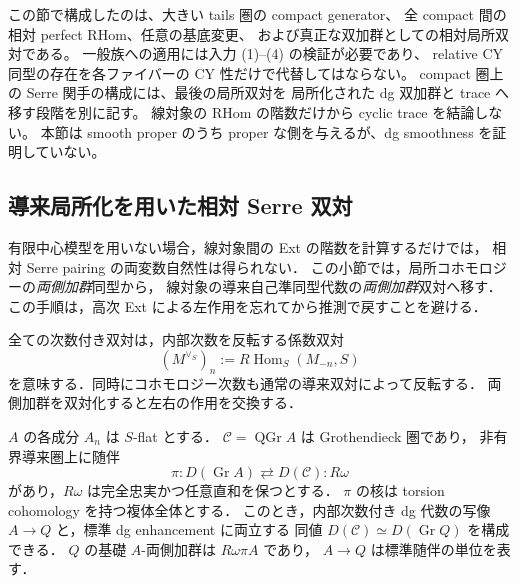 \begin{remark}[ここで確定した範囲と別途必要な入力]
この節で構成したのは、大きい tails 圏の compact generator、
全 compact 間の相対 perfect RHom、任意の基底変更、
および真正な双加群としての相対局所双対である。
一般族への適用には入力 (1)--(4) の検証が必要であり、
relative CY 同型の存在を各ファイバーの CY 性だけで代替してはならない。
compact 圏上の Serre 関手の構成には、最後の局所双対を
局所化された dg 双加群と trace へ移す段階を別に記す。
線対象の RHom の階数だけから cyclic trace を結論しない。
本節は smooth proper のうち proper な側を与えるが、dg smoothness を証明していない。
\end{remark}


\subsection{導来局所化を用いた相対 Serre 双対}
\label{subsec:relative-serre-dg-localization}

有限中心模型を用いない場合，線対象間の Ext の階数を計算するだけでは，
相対 Serre pairing の両変数自然性は得られない．
この小節では，局所コホモロジーの\emph{両側加群}同型から，
線対象の導来自己準同型代数の\emph{両側加群}双対へ移す．
この手順は，高次 Ext による左作用を忘れてから推測で戻すことを避ける．

全ての次数付き双対は，内部次数を反転する係数双対
\[
 (M^{\vee_S})_n
 :=R\operatorname{Hom}_S(M_{-n},S)
\]
を意味する．同時にコホモロジー次数も通常の導来双対によって反転する．
両側加群を双対化すると左右の作用を交換する．


\begin{lemma}
\label{lem:serre-dg-localization-model}
$A$ の各成分 $A_n$ は $S$-flat とする．
$\mathcal C=\operatorname{QGr}A$ は Grothendieck 圏であり，
非有界導来圏上に随伴
\[
 \pi:D(\operatorname{Gr}A)\rightleftarrows D(\mathcal C):R\omega
\]
があり，$R\omega$ は完全忠実かつ任意直和を保つとする．
$\pi$ の核は torsion cohomology を持つ複体全体とする．
このとき，内部次数付き dg 代数の写像 $A\to Q$ と，標準 dg enhancement に両立する
同値 $D(\mathcal C)\simeq D(\operatorname{Gr}Q)$ を構成できる．
$Q$ の基礎 $A$-両側加群は $R\omega\pi A$ であり，
$A\to Q$ は標準随伴の単位を表す．
\end{lemma}

